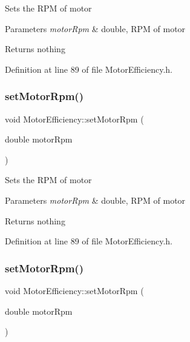 Sets the R\+PM of motor


\begin{DoxyParams}{Parameters}
{\em motor\+Rpm} & double, R\+PM of motor\\
\hline
\end{DoxyParams}
\begin{DoxyReturn}{Returns}
nothing 
\end{DoxyReturn}


Definition at line 89 of file Motor\+Efficiency.\+h.

\mbox{\label{class_motor_efficiency_a2c4ddf9f2f3e44c098dad91a0ddbaf21}} 
\subsubsection{\texorpdfstring{set\+Motor\+Rpm()}{setMotorRpm()}\hspace{0.1cm}{\footnotesize\ttfamily [2/3]}}
{\footnotesize\ttfamily void Motor\+Efficiency\+::set\+Motor\+Rpm (\begin{DoxyParamCaption}\item[{double}]{motor\+Rpm }\end{DoxyParamCaption})\hspace{0.3cm}{\ttfamily [inline]}}

Sets the R\+PM of motor


\begin{DoxyParams}{Parameters}
{\em motor\+Rpm} & double, R\+PM of motor\\
\hline
\end{DoxyParams}
\begin{DoxyReturn}{Returns}
nothing 
\end{DoxyReturn}


Definition at line 89 of file Motor\+Efficiency.\+h.

\mbox{\label{class_motor_efficiency_a2c4ddf9f2f3e44c098dad91a0ddbaf21}} 
\subsubsection{\texorpdfstring{set\+Motor\+Rpm()}{setMotorRpm()}\hspace{0.1cm}{\footnotesize\ttfamily [3/3]}}
{\footnotesize\ttfamily void Motor\+Efficiency\+::set\+Motor\+Rpm (\begin{DoxyParamCaption}\item[{double}]{motor\+Rpm }\end{DoxyParamCaption})\hspace{0.3cm}{\ttfamily [inline]}}

